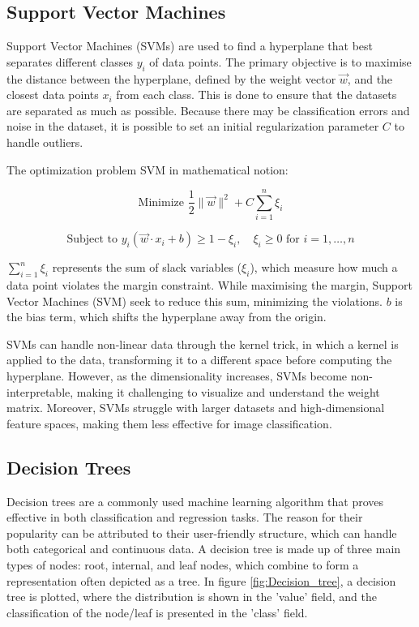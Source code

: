 \subsection{Support Vector Machines}

Support Vector Machines (SVMs) \cite{boser1992training} are used to find a hyperplane that best separates different classes $y_i$ of data points. The primary objective is to maximise the distance between the hyperplane, defined by the weight vector $\vec{w}$, and the closest data points $x_i$ from each class. This is done to ensure that the datasets are separated as much as possible. Because there may be classification errors and noise in the dataset, it is possible to set an initial regularization parameter $C$ to handle outliers.

The optimization problem SVM in mathematical notion:

$$\text{Minimize } \frac{1}{2} \|\vec{w}\|^2 + C \sum_{i=1}^{n} \xi_i$$

$$\text{Subject to } y_i (\vec{w} \cdot x_i + b) \geq 1 - \xi_i, \quad \xi_i \geq 0 \text{ for } i = 1, \ldots, n$$

$\sum_{i=1}^{n} \xi_i$ represents the sum of slack variables ($\xi_i$), which measure how much a data point violates the margin constraint. While maximising the margin, Support Vector Machines (SVM) seek to reduce this sum, minimizing the violations. $ b $ is the bias term, which shifts the hyperplane away from the origin.

SVMs can handle non-linear data through the kernel trick, in which a kernel is applied to the data, transforming it to a different space before computing the hyperplane. However, as the dimensionality increases, SVMs become non-interpretable, making it challenging to visualize and understand the weight matrix. Moreover, SVMs struggle with larger datasets and high-dimensional feature spaces, making them less effective for image classification.


\subsection{Decision Trees}
\label{decision_tree}


Decision trees are a commonly used machine learning algorithm that proves effective in both classification and regression tasks. The reason for their popularity can be attributed to their user-friendly structure, which can handle both categorical and continuous data. A decision tree is made up of three main types of nodes: root, internal, and leaf nodes, which combine to form a representation often depicted as a tree. In figure \ref{fig:Decision_tree}, a decision tree is plotted, where the distribution is shown in the 'value' field, and the classification of the node/leaf is presented in the 'class' field.

